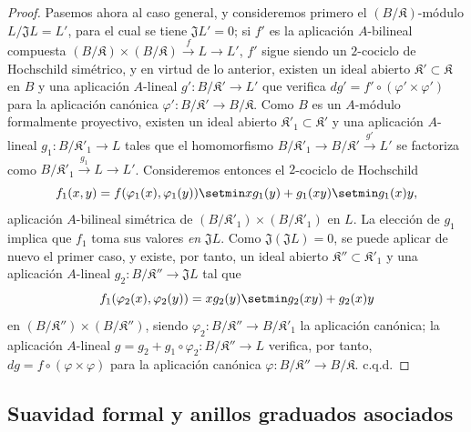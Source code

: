 \begin{proof}
Pasemos ahora al caso general, y consideremos primero el
$(B/\mathfrak K)$-módulo $L/\mathfrak JL=L'$, para el cual se tiene
$\mathfrak JL'=0$; si $f'$ es la aplicación $A$-bilineal compuesta
$(B/\mathfrak K)\times(B/\mathfrak K)\xrightarrow{f}L\to L'$, $f'$ sigue
siendo un $2$-cociclo de Hochschild simétrico, y en virtud de lo anterior,
existen un ideal abierto $\mathfrak K'\subset\mathfrak K$ en $B$ y
una aplicación $A$-lineal $g':B/\mathfrak K'\to L'$ que verifica
$dg'=f'\circ(\varphi'\times\varphi')$ para la aplicación canónica
$\varphi':B/\mathfrak K'\to B/\mathfrak K$. Como $B$ es un
$A$-módulo formalmente proyectivo, existen un ideal abierto
$\mathfrak K'_1\subset\mathfrak K'$ y una aplicación $A$-lineal
$g_1:B/\mathfrak K'_1\to L$ tales que el homomorfismo
$B/\mathfrak K'_1\to B/\mathfrak K'\xrightarrow{g'}L'$ se factoriza como
$B/\mathfrak K'_1\xrightarrow{g_1}L\to L'$. Consideremos entonces el
$2$-cociclo de Hochschild
\[
  f_1(x,y)=f(\varphi_1(x),\varphi_1(y))\setmin xg_1(y)+g_1(xy)\setmin g_1(x)y,
\]
aplicación $A$-bilineal simétrica de
$(B/\mathfrak K'_1)\times(B/\mathfrak K'_1)$ en $L$. La elección de
$g_1$ implica que $f_1$ toma sus valores \emph{en} $\mathfrak JL$. Como
$\mathfrak J(\mathfrak JL)=0$, se puede aplicar de nuevo el primer caso,
y existe, por tanto, un ideal abierto
$\mathfrak K''\subset\mathfrak K'_1$ y una aplicación $A$-lineal
$g_2:B/\mathfrak K''\to\mathfrak JL$ tal que
\[
  f_1(\varphi_2(x),\varphi_2(y))=xg_2(y)\setmin g_2(xy)+g_2(x)y
\]
en $(B/\mathfrak K'')\times(B/\mathfrak K'')$,
siendo $\varphi_2:B/\mathfrak K''\to B/\mathfrak K'_1$ la aplicación
canónica; la aplicación $A$-lineal
$g=g_2+g_1\circ\varphi_2:B/\mathfrak K''\to L$ verifica, por tanto,
$dg=f\circ(\varphi\times\varphi)$ para la aplicación canónica
$\varphi:B/\mathfrak K''\to B/\mathfrak K$. c.q.d.
\end{proof}


\subsection{Suavidad formal y anillos graduados asociados}
\label{subsection:0.19.5-fr}

